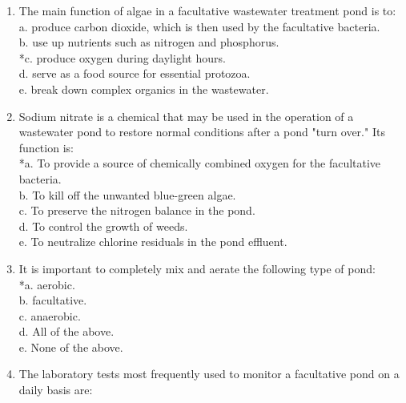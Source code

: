 \begin{enumerate}
\item  The main function of algae in a facultative wastewater treatment pond is to: \\


a. produce carbon dioxide, which is then used by the facultative bacteria. \\

b. use up nutrients such as nitrogen and phosphorus. \\

*c. produce oxygen during daylight hours. \\

d. serve as a food source for essential protozoa. \\

e. break down complex organics in the wastewater. \\


\item  Sodium nitrate is a chemical that may be used in the operation of a wastewater pond to restore normal conditions after a pond "turn over." Its function is: \\


*a. To provide a source of chemically combined oxygen for the facultative bacteria. \\

b. To kill off the unwanted blue-green algae. \\

c. To preserve the nitrogen balance in the pond. \\

d. To control the growth of weeds. \\

e. To neutralize chlorine residuals in the pond effluent. \\


\item  It is important to completely mix and aerate the following type of pond: \\


*a. aerobic. \\

b. facultative. \\

c. anaerobic. \\

d. All of the above. \\

e. None of the above. \\


\item  The laboratory tests most frequently used to monitor a facultative pond on a daily basis are: \\



\end{enumerate}
